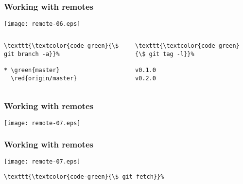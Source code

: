 \documentclass[english]{beamer}
\newcommand{\CMD}[1]{%
\texttt{\textcolor{code-green}{#1}}%
}
\newcommand{\green}[1]{%
\textcolor{code-green}{#1}%
}
\newcommand{\red}[1]{%
\textcolor{code-red}{#1}%
}
\begin{document}
\begin{frame}[fragile]
\frametitle{Working with remotes}

\texttt{[image: remote-06.eps]}

\begin{columns}[t]
        \begin{column}[T]{.5\textwidth}
\pause{}
{\tiny
\begin{Verbatim}[commandchars=\\\{\}]
\CMD{\$ git branch -a}
* \green{master}
  \red{origin/master}
\end{Verbatim}
}

        \end{column}
        \begin{column}[T]{.5\textwidth}
\pause{}
{\tiny
\begin{Verbatim}[commandchars=\\\{\}]
\CMD{\$ git tag -l}
v0.1.0
v0.2.0
\end{Verbatim}
}
        \end{column}
\end{columns}

\vspace{\textheight}
\end{frame}

\begin{frame}[fragile]
\frametitle{Working with remotes}

\texttt{[image: remote-07.eps]}

\vspace{\textheight}
\end{frame}

\begin{frame}[fragile]
\frametitle{Working with remotes}

\texttt{[image: remote-07.eps]}

\begin{Verbatim}[commandchars=\\\{\}]
\CMD{\$ git fetch}
\end{Verbatim}
\vspace{\textheight}
\end{frame}
\end{document}

